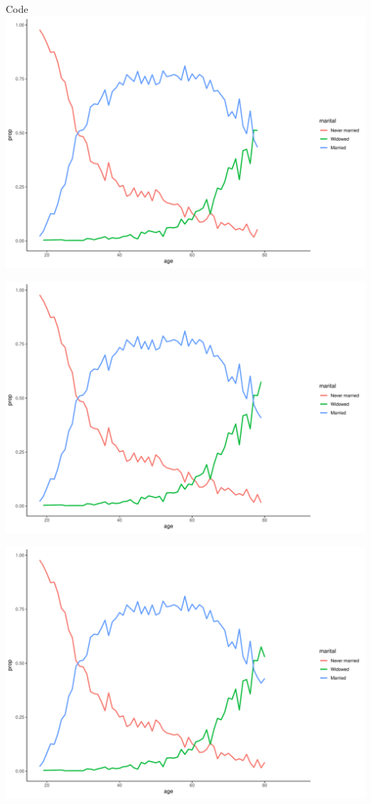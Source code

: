 \documentclass[
  ignorenonframetext,
]{beamer}
\begin{document}
\begin{frame}[fragile]{Code}
\includegraphics{gss_cat_files/figure-beamer/unnamed-chunk-1-89.pdf}

\includegraphics{gss_cat_files/figure-beamer/unnamed-chunk-1-90.pdf}

\includegraphics{gss_cat_files/figure-beamer/unnamed-chunk-1-91.pdf}


\end{frame}
\end{document}

